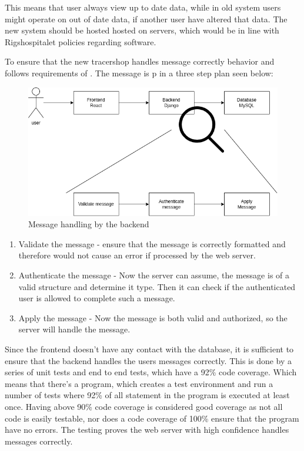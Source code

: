 \documentclass{article}
\begin{document}
This means that user always view up to date data, while in old system users might operate on out of date data, if another user have altered that data.
The new system should be hosted hosted on  servers, which would be in line with Rigshospitalet policies regarding software.

To ensure that the new tracershop handles message correctly behavior and follows requirements of . The message is p in a three step plan seen below:
\begin{figure}[ht]
  \begin{center}
    \includegraphics[width=0.6\linewidth]{MessageHandeling.png}
    \caption{Message handling by the backend}
    \label{fig:messageHandle}
  \end{center}
\end{figure}

\begin{enumerate}
  \item Validate the message - ensure that the message is correctly formatted and therefore would not cause an error if processed by the web server.
  \item Authenticate the message - Now the server can assume, the message is of a valid structure and determine it type.
  Then it can check if the authenticated user is allowed to complete such a message.
  \item Apply the message - Now the message is both valid and authorized, so the server will handle the message.
\end{enumerate}
Since the frontend doesn't have any contact with the database,
it is sufficient to ensure that the backend handles the users messages correctly.
This is done by a series of unit tests and end to end tests, which have a 92\% code coverage.
Which means that there's a program, which creates a test environment and run a number of tests where 92\% of all statement in the program is executed at least once.
Having above 90\% code coverage is considered good coverage as not all code is easily testable, nor does a code coverage of 100\% ensure that the program have no errors.
The testing proves the web server with high confidence handles messages correctly.
\end{document}
